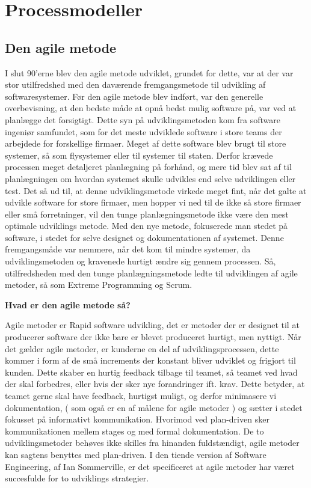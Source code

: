 \chapter{Processmodeller}\label{ch:processmodeller}

\section{Den agile metode}
I slut 90’erne blev den agile metode udviklet, grundet for dette, var at der var stor utilfredshed med den daværende fremgangsmetode til udvikling af softwaresystemer. Før den agile metode blev indført, var den generelle overbevisning, at den bedste måde at opnå bedst mulig software på, var ved at planlægge det forsigtigt. Dette syn på udviklingsmetoden kom fra software ingeniør samfundet, som for det meste udviklede software i store teams der arbejdede for forskellige firmaer. Meget af dette software blev brugt til store systemer, så som flysystemer eller til systemer til staten. Derfor krævede processen meget detaljeret planlægning på forhånd, og mere tid blev sat af til planlægningen om hvordan systemet skulle udvikles end selve udviklingen eller test. 
Det så ud til, at denne udviklingsmetode virkede meget fint, når det galte at udvikle software for store firmaer, men hopper vi ned til de ikke så store firmaer eller små forretninger, vil den tunge planlægningsmetode ikke være den mest optimale udviklings metode. Med den nye metode, fokuserede man stedet på software, i stedet for selve designet og dokumentationen af systemet. Denne fremgangsmåde var nemmere, når det kom til mindre systemer, da  udviklingsmetoden og kravenede hurtigt ændre sig gennem processen. \cite{Sommerville}
Så, utilfredsheden med den tunge planlægningsmetode ledte til udviklingen af agile metoder, så som Extreme Programming og Scrum. 


\textbf{Hvad er den agile metode så?} 

Agile metoder er Rapid software udvikling, det er metoder der er designet til at producerer software der ikke bare er blevet produceret hurtigt, men nyttigt. \cite{Sommerville} Når det gælder agile metoder, er kunderne en del af udviklingsprocessen, dette kommer i form af de små increments der konstant bliver udviklet og frigjort til kunden. Dette skaber en hurtig feedback tilbage til teamet, så teamet ved hvad der skal forbedres, eller hvis der sker nye forandringer ift. krav. Dette betyder, at teamet gerne skal have feedback, hurtigst muligt, og derfor minimasere vi dokumentation, ( som også er en af målene for agile metoder ) og sætter i stedet fokusset på informativt kommunikation. Hvorimod ved plan-driven sker kommunikationen mellem stages og med formal dokumentation. De to udviklingsmetoder behøves ikke skilles fra hinanden fuldstændigt, agile metoder kan sagtens benyttes med plan-driven. \cite{Sommerville}
I den tiende version af Software Engineering, af Ian Sommerville, er det specificeret at agile metoder har været succesfulde for to udviklings strategier.

